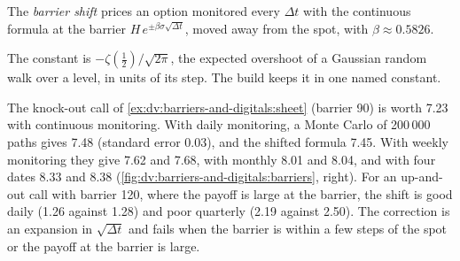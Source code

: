 \begin{definition}\label{def:dv:barriers-and-digitals:shift}
The \emph{barrier shift} prices an option monitored every $\Delta t$ with the continuous
formula at the barrier $H\,e^{\pm\beta\sigma\sqrt{\Delta t}}$, moved away from the spot, with $\beta\approx0.5826$.
\end{definition}

The constant is $-\zeta(\frac12)/\sqrt{2\pi}$, the expected overshoot of a Gaussian random walk over a level, in units
of its step. The build keeps it in one named constant.

\begin{example}\label{ex:dv:barriers-and-digitals:shift}
The knock-out call of \cref{ex:dv:barriers-and-digitals:sheet} (barrier 90) is worth 7.23 with continuous monitoring. With
daily monitoring, a Monte Carlo of 200\,000 paths gives 7.48 (standard error 0.03), and the shifted formula 7.45. With
weekly monitoring they give 7.62 and 7.68, with monthly 8.01 and 8.04, and with four dates 8.33 and 8.38
(\cref{fig:dv:barriers-and-digitals:barriers}, right). For an up-and-out call with barrier 120, where the payoff is large
at the barrier, the shift is good daily (1.26 against 1.28) and poor quarterly (2.19 against 2.50). The correction is an
expansion in $\sqrt{\Delta t}$ and fails when the barrier is within a few steps of the spot or the payoff at the barrier is
large.
\end{example}

